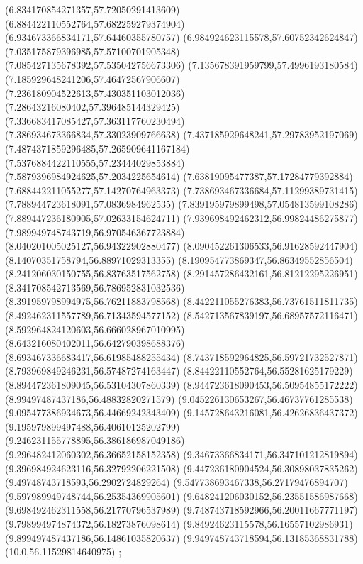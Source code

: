 {(6.834170854271357,57.72050291413609)
(6.884422110552764,57.682259279374904)
(6.934673366834171,57.64460355780757)
(6.984924623115578,57.60752342624847)
(7.035175879396985,57.57100701905348)
(7.085427135678392,57.535042756673306)
(7.135678391959799,57.4996193180584)
(7.185929648241206,57.46472567906607)
(7.236180904522613,57.430351103012036)
(7.28643216080402,57.396485144329425)
(7.336683417085427,57.363117760230494)
(7.386934673366834,57.33023909766638)
(7.437185929648241,57.29783952197069)
(7.4874371859296485,57.265909641167184)
(7.5376884422110555,57.23444029853884)
(7.5879396984924625,57.2034225654614)
(7.63819095477387,57.17284779392884)
(7.688442211055277,57.14270764963373)
(7.738693467336684,57.11299389731415)
(7.788944723618091,57.0836984962535)
(7.839195979899498,57.054813599108286)
(7.889447236180905,57.02633154624711)
(7.939698492462312,56.99824486275877)
(7.989949748743719,56.970546367723884)
(8.040201005025127,56.94322902880477)
(8.090452261306533,56.91628592447904)
(8.14070351758794,56.88971029313355)
(8.190954773869347,56.86349552856504)
(8.241206030150755,56.83763517562758)
(8.291457286432161,56.81212295226951)
(8.341708542713569,56.786952831032536)
(8.391959798994975,56.76211883798568)
(8.442211055276383,56.73761511811735)
(8.492462311557789,56.71343594577152)
(8.542713567839197,56.68957572116471)
(8.592964824120603,56.666028967010995)
(8.643216080402011,56.642790398688376)
(8.693467336683417,56.61985488255434)
(8.743718592964825,56.59721732527871)
(8.793969849246231,56.57487274163447)
(8.84422110552764,56.55281625179229)
(8.894472361809045,56.53104307860339)
(8.944723618090453,56.50954855172222)
(8.99497487437186,56.48832820271579)
(9.045226130653267,56.46737761285538)
(9.095477386934673,56.44669242343409)
(9.145728643216081,56.42626836437372)
(9.195979899497488,56.40610125202799)
(9.246231155778895,56.386186987049186)
(9.296482412060302,56.36652158152358)
(9.34673366834171,56.347101212819894)
(9.396984924623116,56.32792206221508)
(9.447236180904524,56.30898037835262)
(9.49748743718593,56.2902724829264)
(9.547738693467338,56.27179476894707)
(9.597989949748744,56.25354369905601)
(9.648241206030152,56.23551586987668)
(9.698492462311558,56.21770796537989)
(9.748743718592966,56.20011667771197)
(9.798994974874372,56.18273876098614)
(9.84924623115578,56.16557102986931)
(9.899497487437186,56.14861035820637)
(9.949748743718594,56.13185368831788)
(10.0,56.11529814640975)
};
